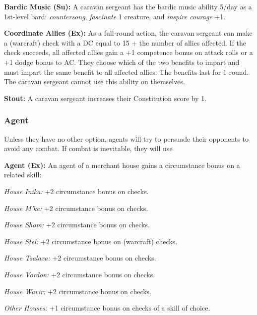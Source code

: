 \textbf{Bardic Music (Su):} A caravan sergeant has the bardic music ability 5/day as a 1st-level bard: \emph{countersong}, \emph{fascinate} 1 creature, and \emph{inspire courage} +1.

\textbf{Coordinate Allies (Ex):} As a full-round action, the caravan sergeant can make a  (warcraft) check with a DC equal to 15 + the number of allies affected. If the check succeeds, all affected allies gain a +1 competence bonus on attack rolls or a +1 dodge bonus to AC. They choose which of the two benefits to impart and must impart the same benefit to all affected allies. The benefits last for 1 round. The caravan sergeant cannot use this ability on themselves.

\textbf{Stout:} A caravan sergeant increases their Constitution score by 1.


\subsubsection{Agent}

Unless they have no other option, agents will try to persuade their opponents to avoid any combat. If combat is inevitable, they will use 

\textbf{Agent (Ex):} An agent of a merchant house gains a circumstance bonus on a related skill:

\textit{House Inika:} +2 circumstance bonus on  checks.

\textit{House M'ke:} +2 circumstance bonus on  checks.

\textit{House Shom:} +2 circumstance bonus on  checks.

\textit{House Stel:} +2 circumstance bonus on  (warcraft) checks.

\textit{House Tsalaxa:} +2 circumstance bonus on  checks.

\textit{House Vordon:} +2 circumstance bonus on  checks.

\textit{House Wavir:} +2 circumstance bonus on  checks.

\textit{Other Houses:} +1 circumstance bonus on checks of a skill of choice.

